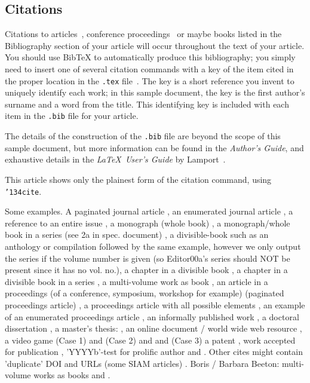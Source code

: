 \subsection{Citations}
Citations to articles~\cite{bowman:reasoning,
clark:pct, braams:babel, herlihy:methodology},
conference proceedings~\cite{clark:pct} or maybe
books \cite{Lamport:LaTeX, salas:calculus} listed
in the Bibliography section of your
article will occur throughout the text of your article.
You should use BibTeX to automatically produce this bibliography;
you simply need to insert one of several citation commands with
a key of the item cited in the proper location in
the \texttt{.tex} file~\cite{Lamport:LaTeX}.
The key is a short reference you invent to uniquely
identify each work; in this sample document, the key is
the first author's surname and a
word from the title.  This identifying key is included
with each item in the \texttt{.bib} file for your article.

The details of the construction of the \texttt{.bib} file
are beyond the scope of this sample document, but more
information can be found in the \textit{Author's Guide},
and exhaustive details in the \textit{\LaTeX\ User's
Guide} by Lamport~.

This article shows only the plainest form
of the citation command, using \texttt{{\char'134}cite}.

Some examples.  A paginated journal article \cite{Abril07}, an enumerated
journal article \cite{Cohen07}, a reference to an entire issue \cite{JCohen96},
a monograph (whole book) \cite{Kosiur01}, a monograph/whole book in a series (see 2a in spec. document)
\cite{Harel79}, a divisible-book such as an anthology or compilation \cite{Editor00}
followed by the same example, however we only output the series if the volume number is given
\cite{Editor00a} (so Editor00a's series should NOT be present since it has no vol. no.),
a chapter in a divisible book \cite{Spector90}, a chapter in a divisible book
in a series \cite{Douglass98}, a multi-volume work as book \cite{Knuth97},
an article in a proceedings (of a conference, symposium, workshop for example)
(paginated proceedings article) \cite{Andler79}, a proceedings article
with all possible elements \cite{Smith10}, an example of an enumerated
proceedings article \cite{VanGundy07},
an informally published work \cite{Harel78}, a doctoral dissertation \cite{Clarkson85},
a master's thesis: \cite{anisi03}, an online document / world wide web
resource \cite{Thornburg01, Ablamowicz07, Poker06}, a video game (Case 1) \cite{Obama08} and (Case 2) \cite{Novak03}
and \cite{Lee05} and (Case 3) a patent \cite{JoeScientist001},
work accepted for publication \cite{rous08}, 'YYYYb'-test for prolific author
\cite{SaeediMEJ10} and \cite{SaeediJETC10}. Other cites might contain
'duplicate' DOI and URLs (some SIAM articles) \cite{Kirschmer:2010:AEI:1958016.1958018}.
Boris / Barbara Beeton: multi-volume works as books
\cite{MR781536} and \cite{MR781537}.

